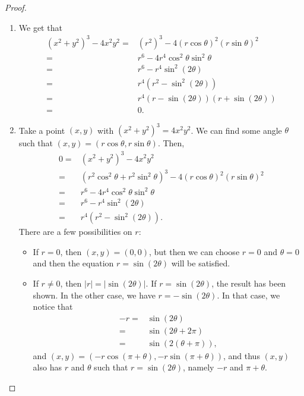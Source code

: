 \begin{proof}
    \begin{enumerate}
        \item We get that
        \begin{align*}
            (x^2 + y^2)^3 - 4x^2 y^2
            = & (r^2)^3 - 4(r\cos\theta)^2 (r\sin\theta)^2\\
            = & r^6 - 4r^4 \cos^2\theta \sin^2\theta\\
            = & r^6 - r^4 \sin^2(2\theta)\\
            = & r^4(r^2 - \sin^2(2\theta))\\
            = & r^4(r-\sin(2\theta))(r+\sin(2\theta))\\
            = & 0.
        \end{align*}
        \item Take a point $(x,y)$ with $(x^2 + y^2)^3 = 4x^2y^2$. We can find some angle $\theta$ such that $(x,y) = (r\cos\theta, r\sin\theta)$. Then,
        \begin{align*}
            0
            = & (x^2 + y^2)^3 - 4x^2 y^2\\
            = & (r^2\cos^2\theta + r^2\sin^2\theta)^3 - 4(r\cos\theta)^2 (r\sin\theta)^2\\
            = & r^6 - 4r^4 \cos^2\theta \sin^2\theta\\
            = & r^6 - r^4 \sin^2(2\theta)\\
            = & r^4 (r^2 - \sin^2(2\theta)).
        \end{align*}
        There are a few possibilities on $r$:
        \begin{itemize}
            \item If $r=0$, then $(x,y) = (0,0)$, but then we can choose $r=0$ and $\theta = 0$ and then the equation $r=\sin(2\theta)$ will be satisfied.
            \item If $r\neq 0$, then $|r| = |\sin(2\theta)|$. 
            If $r = \sin(2\theta)$, the result has been shown. 
            In the other case, we have $r=-\sin(2\theta)$. 
            In that case, we notice that
            \begin{align*}
                -r
                = & \sin(2\theta)\\
                = & \sin(2\theta + 2\pi)\\
                = & \sin(2(\theta + \pi)),
            \end{align*}
            and $(x,y) = (-r\cos(\pi + \theta), -r\sin(\pi + \theta))$, and thus $(x,y)$ also has $r$ and $\theta$ such that $r=\sin(2\theta)$, namely $-r$ and $\pi+\theta$.
        \end{itemize}
    \end{enumerate}
\end{proof}

